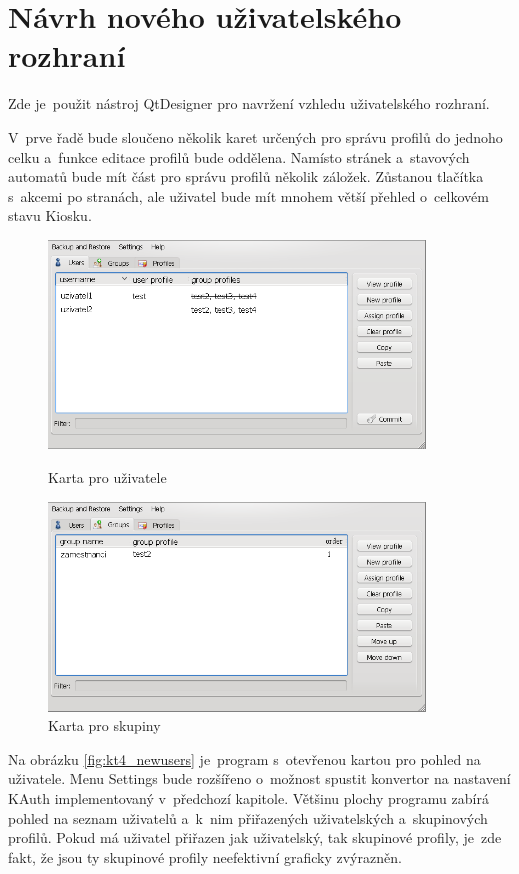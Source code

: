 \section{Návrh nového uživatelského rozhraní}
Zde je~použit nástroj QtDesigner pro navržení vzhledu uživatelského rozhraní.

V~prve řadě bude sloučeno několik karet určených pro správu profilů do jednoho celku a~funkce editace profilů bude oddělena. Namísto stránek a~stavových automatů bude mít část pro správu profilů několik záložek. Zůstanou tlačítka s~akcemi po stranách, ale uživatel bude mít mnohem větší přehled o~celkovém stavu Kiosku.

\begin{figure}
\centering
\includegraphics[width=10cm, keepaspectratio]{obrazky/navrh-usersz.png}
\caption{Karta pro uživatele}
\vspace{5 mm}
\label{fig:kt4_newusers}
\includegraphics[width=10cm, keepaspectratio]{obrazky/navrh-groupsz.png}
\caption{Karta pro skupiny}
\label{fig:kt4_newgroups}
\end{figure}

Na obrázku \ref{fig:kt4_newusers} je~program s~otevřenou kartou pro pohled na uživatele. Menu Settings bude rozšířeno o~možnost spustit konvertor na nastavení KAuth implementovaný v~předchozí kapitole. Většinu plochy programu zabírá pohled na seznam uživatelů a~k~nim přiřazených uživatelských a~skupinových profilů. Pokud má uživatel přiřazen jak uživatelský, tak skupinové profily, je~zde fakt, že jsou ty skupinové profily neefektivní graficky zvýrazněn.

